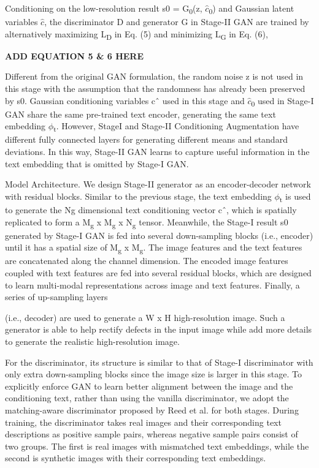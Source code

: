 \documentclass[a4paper,12pt,oneside]{article}
\begin{document}
Conditioning on the low-resolution result s0 = G\textsubscript{0}(z, $\hat{c}$\textsubscript{0}) and Gaussian latent variables $\hat{c}$, the discriminator D and generator G in Stage-II GAN are trained by alternatively maximizing L\textsubscript{D} in Eq. (5) and minimizing L\textsubscript{G} in Eq. (6), 

\textbf{ADD EQUATION 5 \& 6 HERE}

Different from the original GAN formulation, the random noise z is not used in this stage with the assumption that the randomness has already been preserved by s0. Gaussian conditioning variables cˆ used in this stage and $\hat{c}$\textsubscript{0} used in Stage-I GAN share the same pre-trained text encoder, generating the same text embedding $\phi$\textsubscript{t}. However, StageI and Stage-II Conditioning Augmentation have different fully connected layers for generating different means and standard deviations. In this way, Stage-II GAN learns to capture useful information in the text embedding that is omitted by Stage-I GAN. 

Model Architecture. We design Stage-II generator as an encoder-decoder 
network with residual blocks. Similar to the previous stage, the text
embedding $\phi$\textsubscript{t} is used to generate the Ng dimensional text conditioning 
vector cˆ, which is spatially replicated to form a M\textsubscript{g} x
M\textsubscript{g} x N\textsubscript{g} tensor. Meanwhile, the Stage-I 
result s0 generated by Stage-I GAN is fed into several down-sampling blocks (i.e., encoder) until it has a spatial size of M\textsubscript{g} x M\textsubscript{g}. The image features and the text features are concatenated along the channel dimension. The encoded image features coupled with text features are fed into several residual blocks, which are designed to learn multi-modal representations across image and text features. Finally, a series of up-sampling layers 

(i.e., decoder) are used to generate a W x H high-resolution image. Such a generator is able to help rectify defects in the input image while add more details to generate the realistic high-resolution image. 

For the discriminator, its structure is similar to that of Stage-I discriminator with only extra down-sampling blocks since the image size is larger in this stage. To explicitly enforce GAN to learn better alignment between the image and the conditioning text, rather than using the vanilla discriminator, we adopt the matching-aware discriminator proposed by Reed et al. for both stages. During training, the discriminator takes real images and their corresponding text descriptions as positive sample pairs, whereas negative sample pairs consist of two groups. The first is real images with mismatched text embeddings, while the second is synthetic images with their corresponding text embeddings. 
\end{document}
